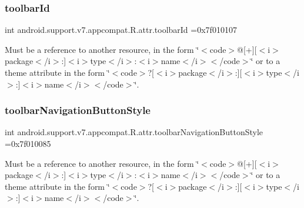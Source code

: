 \subsubsection{\texorpdfstring{toolbar\+Id}{toolbarId}}
{\footnotesize\ttfamily int android.\+support.\+v7.\+appcompat.\+R.\+attr.\+toolbar\+Id =0x7f010107\hspace{0.3cm}{\ttfamily [static]}}

Must be a reference to another resource, in the form \char`\"{}$<$code$>$@\mbox{[}+\mbox{]}\mbox{[}$<$i$>$package$<$/i$>$\+:\mbox{]}$<$i$>$type$<$/i$>$\+:$<$i$>$name$<$/i$>$$<$/code$>$\char`\"{} or to a theme attribute in the form \char`\"{}$<$code$>$?\mbox{[}$<$i$>$package$<$/i$>$\+:\mbox{]}\mbox{[}$<$i$>$type$<$/i$>$\+:\mbox{]}$<$i$>$name$<$/i$>$$<$/code$>$\char`\"{}. \mbox{\label{classandroid_1_1support_1_1v7_1_1appcompat_1_1R_1_1attr_ae7c3c73d23efd4eedd165383feacbf68}} 
\subsubsection{\texorpdfstring{toolbar\+Navigation\+Button\+Style}{toolbarNavigationButtonStyle}}
{\footnotesize\ttfamily int android.\+support.\+v7.\+appcompat.\+R.\+attr.\+toolbar\+Navigation\+Button\+Style =0x7f010085\hspace{0.3cm}{\ttfamily [static]}}

Must be a reference to another resource, in the form \char`\"{}$<$code$>$@\mbox{[}+\mbox{]}\mbox{[}$<$i$>$package$<$/i$>$\+:\mbox{]}$<$i$>$type$<$/i$>$\+:$<$i$>$name$<$/i$>$$<$/code$>$\char`\"{} or to a theme attribute in the form \char`\"{}$<$code$>$?\mbox{[}$<$i$>$package$<$/i$>$\+:\mbox{]}\mbox{[}$<$i$>$type$<$/i$>$\+:\mbox{]}$<$i$>$name$<$/i$>$$<$/code$>$\char`\"{}. \mbox{\label{classandroid_1_1support_1_1v7_1_1appcompat_1_1R_1_1attr_af5896838850b900b5fc76c6bbda40f7f}} 
